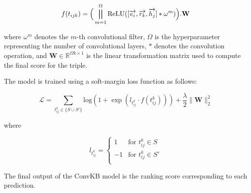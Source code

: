 \begin{equation}
	f(t_{ijk}) = \Big( \bigparallel_{m=1}^{\Omega} \text{ReLU} ([\overrightarrow{e_i}, \overrightarrow{r_k}, \overrightarrow{h_j}] \ast \omega^m)\Big).\mathbf{W}
\end{equation}

where $\omega^m$ denotes the $m$-th convolutional filter,  
$\Omega$ is the hyperparameter representing the number of convolutional layers,  
$\ast$ denotes the convolution operation, and  
$\mathbf{W} \in \mathbb{R}^{\Omega k \times 1}$ is the linear transformation matrix used to compute the final score for the triple.  

The model is trained using a soft-margin loss function as follows:

\begin{equation}
	\label{eq:lossConvKB}
	\mathcal{L} = \sum_{t^k_{ij} \in \{S \cup S'\}} \text{log}(1 + \exp(l_{t^k_{ij}} \cdot f(t^k_{ij}))) + \frac{\lambda}{2} \parallel{\mathbf{W}}\parallel_2^2
\end{equation}

where 

\[
l_{t^k_{ij}} = 
\begin{cases}
	1 & \text{for } t^k_{ij} \in S \\
	-1 & \text{for } t^k_{ij} \in S' \\
\end{cases}
\]

The final output of the ConvKB model is the ranking score corresponding to each prediction.
